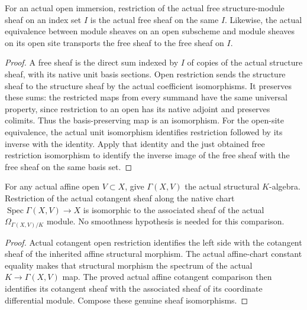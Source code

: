 \begin{lemma}
\label{sc0-canonical-port:geom:actual-free-sheaf-open-transport}
\leanok
For an actual open immersion, restriction of the actual
free structure-module sheaf on an index set \(I\)
is the actual free sheaf on the same \(I\).
Likewise, the actual equivalence between module sheaves on
an open subscheme and module sheaves on its open site
transports the free sheaf to the free sheaf on \(I\).
\end{lemma}
\begin{proof}
A free sheaf is the direct sum indexed by \(I\) of
copies of the actual structure sheaf, with its native
unit basis sections. Open restriction sends the structure
sheaf to the structure sheaf by the actual coefficient
isomorphisms. It preserves these sums: the restricted maps
from every summand have the same universal property, since
restriction to an open has its native adjoint and preserves
colimits. Thus the basis-preserving map is an isomorphism.
For the open-site equivalence, the actual unit isomorphism
identifies restriction followed by its inverse with the
identity. Apply that identity and the just obtained free
restriction isomorphism to identify the inverse image of
the free sheaf with the free sheaf on the same basis set.
\end{proof}

\begin{theorem}
\label{sc0-canonical-port:geom:actual-affine-chart-cotangent-comparison}
\leanok
For any actual affine open \(V\subset X\), give
\(\Gamma(X,V)\) the actual structural \(K\)-algebra.
Restriction of the actual cotangent sheaf along the
native chart \(\operatorname{Spec}\Gamma(X,V)\to X\)
is isomorphic to the associated sheaf of the actual
\(\Omega_{\Gamma(X,V)/K}\) module.
No smoothness hypothesis is needed for this comparison.
\end{theorem}
\begin{proof}
Actual cotangent open restriction identifies the left side
with the cotangent sheaf of the inherited affine structural
morphism. The actual affine-chart constant equality makes
that structural morphism the spectrum of the actual
\(K\to\Gamma(X,V)\) map. The proved actual affine
cotangent comparison then identifies its cotangent sheaf
with the associated sheaf of its coordinate differential
module. Compose these genuine sheaf isomorphisms.
\end{proof}

